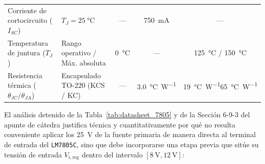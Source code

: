 \begin{table}[htbp]
{\begin{tabular}{llccc}
Corriente de cortocircuito ($I_{SC}$) & $T_J = \SI{25}{\celsius}$ & --- & \SI{750}{\milli\ampere} & --- \\
Temperatura de juntura ($T_J$) & Rango operativo / Máx. absoluta & \SI{0}{\celsius} & --- & \SI{125}{\celsius} / \SI{150}{\celsius} \\
Resistencia térmica ($\theta_{JC} / \theta_{JA}$) & Encapsulado TO-220 (KCS / KC) & --- & \SI{3,0}{\celsius\per\watt} & \SI{19}{\celsius\per\watt}\text{--}\SI{65}{\celsius\per\watt} \\
\bottomrule
\end{tabular}%
}
\end{table}

El análisis detenido de la Tabla~\ref{tab:datasheet_7805} y de la Sección 6-9-3 del apunte de cátedra \cite{gonzalez_p3} justifica técnica y cuantitativamente por qué no resulta conveniente aplicar los \SI{25}{\volt} de la fuente primaria de manera directa al terminal de entrada del \texttt{LM7805C}, sino que debe incorporarse una etapa previa que sitúe su tensión de entrada $V_{i,\text{reg}}$ dentro del intervalo $[\SI{8}{\volt}, \SI{12}{\volt}]$:
